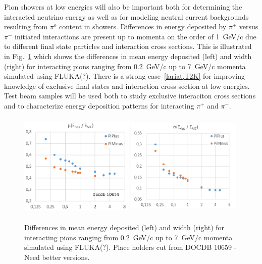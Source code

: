 Pion showers at low energies will also be important both for determining the interacted neutrino energy as well
as for modeling neutral current backgrounds resulting from $\pi^o$ content in showers. Differences in energy deposited
by $\pi^+$ versus $\pi^-$ initiated interactions are present up to momenta on the order of 1~GeV/c due to different
final state particles and interaction cross sections. This is illustrated in 
Fig.~\ref{fig:pionshwr} which shows the differences in mean energy deposited (left) and width (right) 
for interacting pions ranging from 0.2~GeV/c up to 7~GeV/c momenta simulated using FLUKA(?).
There is a strong case~\ref{lariat,T2K} for improving 
knowledge of exclusive final states and interaction cross section at low energies. Test beam samples
will be used both to study exclusive interaciton cross sections and to characterize energy deposition 
patterns for interacting  $\pi^+$ and $\pi^-$.
\begin{figure}[h!]
  \centering
\includegraphics[width=0.49\textwidth,height=5.0cm]{figures/pi+pi-_means}
\includegraphics[width=0.49\textwidth,height=5.0cm]{figures/pi+pi-_sig}
\label{fig:pionshwr}
  \caption{Differences in mean energy deposited (left) and width (right) 
for interacting pions ranging from 0.2~GeV/c up to 7~GeV/c momenta simulated using FLUKA(?).
{\color{red}
Place holders cut from DOCDB 10659  - Need better versions.
}
}
\end{figure}


